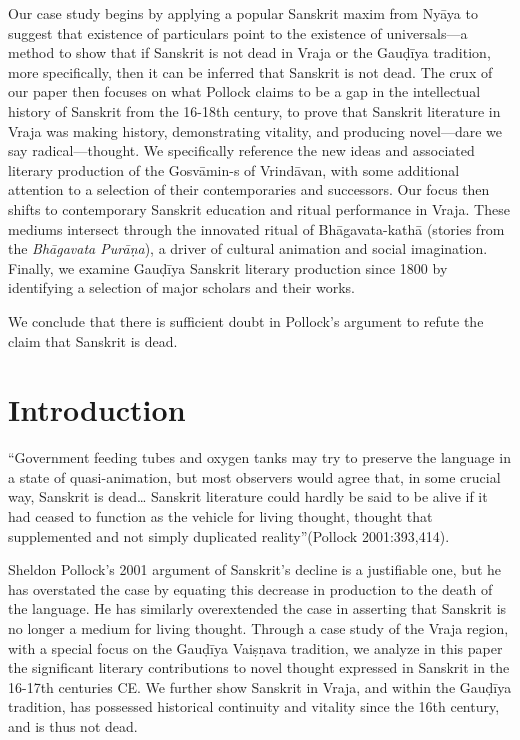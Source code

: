 Our case study begins by applying a popular Sanskrit maxim from Nyāya to suggest that existence of particulars point to the existence of universals—a method to show that if Sanskrit is not dead in Vraja or the Gauḍīya tradition, more specifically, then it can be inferred that Sanskrit is not dead.  The crux of our paper then focuses on what Pollock claims to be a gap in the intellectual history of Sanskrit from the 16-18th century, to prove that Sanskrit literature in Vraja was making history, demonstrating vitality, and producing novel—dare we say radical—thought.  We specifically reference the new ideas and associated literary production of the Gosvāmin-s of Vrindāvan, with some additional attention to a selection of their contemporaries and successors.  Our focus then shifts to contemporary Sanskrit education and ritual performance in Vraja.  These mediums intersect through the innovated ritual of Bhāgavata-kathā (stories from the {\sl Bhāgavata Purāṇa}), a driver of cultural animation and social imagination.  Finally, we examine Gauḍīya Sanskrit literary production since 1800 by identifying a selection of major scholars and their works.  

We conclude that there is sufficient doubt in Pollock’s argument to refute the claim that Sanskrit is dead.   

\section*{Introduction}

\begin{myquote}
\eleven
“Government feeding tubes and oxygen tanks may try to preserve the language in a state of quasi-animation, but most observers would agree that, in some crucial way, Sanskrit is dead… Sanskrit literature could hardly be said to be alive if it had ceased to function as the vehicle for living thought, thought that supplemented and not simply duplicated reality”\hfill(Pollock 2001:393,414).
\end{myquote}
\newpage

Sheldon Pollock’s 2001 argument of Sanskrit’s decline is a justifiable one, but he has overstated the case by equating this decrease in production to the death of the language. He has similarly overextended the case in asserting that Sanskrit is no longer a medium for living thought. Through a case study of the Vraja region, with a special focus on the Gauḍīya Vaiṣṇava tradition, we analyze in this paper the significant literary contributions to novel thought expressed in Sanskrit in the 16-17th centuries CE. We further show Sanskrit in Vraja, and within the Gauḍīya tradition, has possessed historical continuity and vitality since the 16th century, and is thus not dead.
\vskip 2pt

